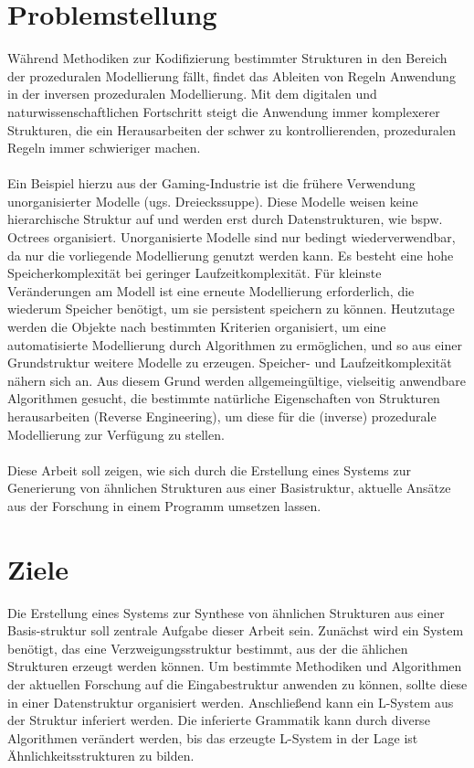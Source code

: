 \section{Problemstellung}
Während Methodiken zur Kodifizierung bestimmter Strukturen in den Bereich der prozeduralen Modellierung fällt,
findet das Ableiten von Regeln Anwendung in der inversen prozeduralen Modellierung.
Mit dem digitalen und naturwissenschaftlichen Fortschritt steigt die Anwendung immer komplexerer Strukturen, die
ein Herausarbeiten der schwer zu kontrollierenden, prozeduralen Regeln immer schwieriger machen.
\\~\\
Ein Beispiel hierzu aus der Gaming-Industrie ist die frühere Verwendung unorganisierter Modelle (ugs. Dreieckssuppe).
Diese Modelle weisen keine hierarchische Struktur auf und werden erst durch Datenstrukturen, wie bspw. Octrees organisiert.
Unorganisierte Modelle sind nur bedingt wiederverwendbar, da nur die vorliegende Modellierung genutzt werden kann.
Es besteht eine hohe Speicherkomplexität bei geringer Laufzeitkomplexität.
Für kleinste Veränderungen am Modell ist eine erneute Modellierung erforderlich, die wiederum Speicher benötigt, um sie
persistent speichern zu können.
Heutzutage werden die Objekte nach bestimmten Kriterien organisiert, um eine automatisierte Modellierung durch Algorithmen
zu ermöglichen, und so aus einer Grundstruktur weitere Modelle zu erzeugen.
Speicher- und Laufzeitkomplexität nähern sich an.
Aus diesem Grund werden allgemeingültige, vielseitig anwendbare Algorithmen gesucht, die bestimmte natürliche Eigenschaften
von Strukturen herausarbeiten (Reverse Engineering), um diese für die (inverse) prozedurale Modellierung zur
Verfügung zu stellen.
\\~\\
Diese Arbeit soll zeigen, wie sich durch die Erstellung eines Systems zur Generierung von ähnlichen Strukturen aus einer
Basistruktur, aktuelle Ansätze aus der Forschung in einem Programm umsetzen lassen.

\newpage

\section{Ziele}
Die Erstellung eines Systems zur Synthese von ähnlichen Strukturen aus einer Basis-struktur soll zentrale Aufgabe dieser
Arbeit sein.
Zunächst wird ein System benötigt, das eine Verzweigungsstruktur bestimmt, aus der die ählichen Strukturen erzeugt
werden können.
Um bestimmte Methodiken und Algorithmen der aktuellen Forschung auf die Eingabestruktur anwenden zu können, sollte diese
in einer Datenstruktur organisiert werden.
Anschließend kann ein L-System aus der Struktur inferiert werden.
Die inferierte Grammatik kann durch diverse Algorithmen verändert werden, bis das erzeugte L-System in der Lage ist
Ähnlichkeitsstrukturen zu bilden.

